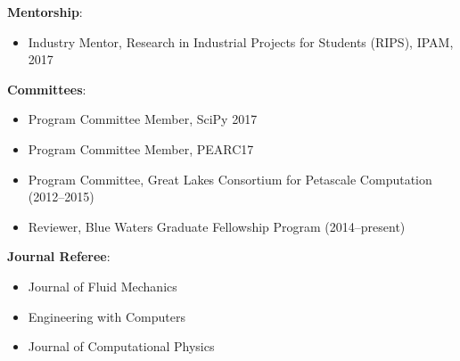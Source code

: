 
\textbf{Mentorship}:
\begin{itemize}
\itemsep 0pt
 \item Industry Mentor, Research in Industrial Projects for Students
       (RIPS), IPAM, 2017
\end{itemize}

\blankline


\textbf{Committees}:
\begin{itemize}
\itemsep 0pt
 \item Program Committee Member, SciPy 2017
 \item Program Committee Member, PEARC17
 \item Program Committee, Great Lakes Consortium for Petascale Computation (2012--2015)
 \item Reviewer, Blue Waters Graduate Fellowship Program (2014--present)
\end{itemize}

\blankline

\textbf{Journal Referee}:
\begin{itemize}
\itemsep 0pt
 \item Journal of Fluid Mechanics
 \item Engineering with Computers
 \item Journal of Computational Physics
\end{itemize}

